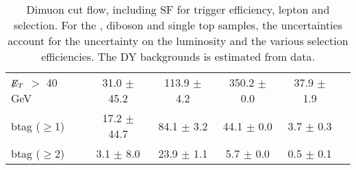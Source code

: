 \documentclass[amsmath,amssymb]{revtex4}
\begin{document}
\begin{landscape}
\begin{table}[p]
\begin{tabular}{|l|c|c|c|c|c|}
$\not\!\!E_T$ $>$ 40 GeV & 31.0 $\pm$ 45.2 & 113.9 $\pm$ 4.2 & 350.2 $\pm$ 0.0 & 37.9 $\pm$ 1.9 \\
btag ($\ge$1) & 17.2 $\pm$ 44.7 & 84.1 $\pm$ 3.2 & 44.1 $\pm$ 0.0 & 3.7 $\pm$ 0.3 \\
btag ($\ge$2) & 3.1 $\pm$ 8.0 & 23.9 $\pm$ 1.1 & 5.7 $\pm$ 0.0 & 0.5 $\pm$ 0.1 \\
\hline 
\hline
\end{tabular}
\caption{Dimuon cut flow, including SF for trigger efficiency, lepton and \met selection. For the \ttbar, diboson and single top samples, the uncertainties account for the uncertainty on the luminosity and the various selection efficiencies. The DY backgrounds is estimated from data.}
\label{Table:CutFlow_mumu}
\end{table}
\end{landscape}
\clearpage
\end{document}
